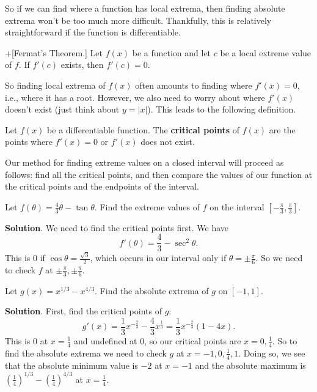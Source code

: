 \documentclass[10pt,]{book}
\newcommand{\terminology}[1]{\textbf{#1}}
\theoremstyle{ptxplainnotitle}
\theoremstyle{ptxplaintitle}
\theoremstyle{ptxplainnotitle}
\theoremstyle{ptxplaintitle}
\theoremstyle{ptxplainnotitle}
\theoremstyle{ptxplaintitle}
\theoremstyle{ptxdefinitionnotitle}
\theoremstyle{ptxdefinitiontitle}
\theoremstyle{ptxdefinitionnotitle}
\theoremstyle{ptxdefinitiontitle}
\theoremstyle{ptxdefinitionnotitle}
\theoremstyle{ptxdefinitiontitle}
\theoremstyle{ptxdefinitionnotitle}
\theoremstyle{ptxdefinitiontitle}
\theoremstyle{ptxdefinitionnotitle}
\theoremstyle{ptxdefinitiontitle}
\numberwithin{equation}{section}
\begin{document}
\hypertarget{p-319}{}%
So if we can find where a function has local extrema, then finding absolute extrema won't be too much more difficult. Thankfully, this is relatively straightforward if the function is differentiable.%
\begin{theorem}+[{Fermat's Theorem.}]\label{theorem-fermat-s-theorem}
\hypertarget{p-320}{}%
Let \(f(x)\) be a function and let \(c\) be a local extreme value of \(f\). If \(f'(c)\) exists, then \(f'(c) = 0\).%
\end{theorem}
\hypertarget{p-321}{}%
So finding local extrema of \(f(x)\) often amounts to finding where \(f'(x) = 0\), i.e., where it has a root. However, we also need to worry about where \(f'(x)\) doesn't exist (just think about \(y = |x|\)). This leads to the following definition.%
\begin{definition}\label{definition-critical-points}
\hypertarget{p-322}{}%
Let \(f(x)\) be a differentiable function. The \terminology{critical points} of \(f(x)\) are the points where \(f'(x) = 0\) or \(f'(x)\) does not exist.%
\end{definition}
\hypertarget{p-323}{}%
Our method for finding extreme values on a closed interval will proceed as follows: find all the critical points, and then compare the values of our function at the critical points and the endpoints of the interval.%
\begin{example}\label{example-extreme-values-of-tangent}
\hypertarget{p-324}{}%
Let \(f(\theta) = \frac{4}{3}\theta - \tan\theta\). Find the extreme values of \(f\) on the interval \([-\frac{\pi}{3},\frac{\pi}{3}]\).%
\par\smallskip%
\noindent\textbf{Solution}.\hypertarget{solution-71}{}\quad%
\hypertarget{p-325}{}%
We need to find the critical points first. We have%
\begin{equation*}
f'(\theta) = \frac{4}{3} - \sec^{2}\theta.
\end{equation*}
This is \(0\) if \(\cos\theta = \frac{\sqrt{3}}{2}\), which occurs in our interval only if \(\theta = \pm\frac{\pi}{6}\). So we need to check \(f\) at \(\pm\frac{\pi}{3},\pm\frac{\pi}{6}\).%
\end{example}
\begin{example}\label{example-dealing-with-a-cusp}
\hypertarget{p-326}{}%
Let \(g(x) = x^{1/3} - x^{4/3}\). Find the absolute extrema of \(g\) on \([-1,1]\).%
\par\smallskip%
\noindent\textbf{Solution}.\hypertarget{solution-72}{}\quad%
\hypertarget{p-327}{}%
First, find the critical points of \(g\):%
\begin{equation*}
g'(x) = \frac{1}{3}x^{-\frac{2}{3}} - \frac{4}{3}x^{\frac{1}{3}} = \frac{1}{3}x^{-\frac{2}{3}}(1 - 4x).
\end{equation*}
This is \(0\) at \(x = \frac{1}{4}\) and undefined at \(0\), so our critical points are \(x=0,\frac{1}{4}\). So to find the absolute extrema we need to check \(g\) at \(x=-1,0,\frac{1}{4},1\). Doing so, we see that the absolute minimum value is \(-2\) at \(x=-1\) and the absolute maximum is \((\frac{1}{4})^{1/3} - (\frac{1}{4})^{4/3}\) at \(x = \frac{1}{4}\).%
\end{example}
\end{document}
